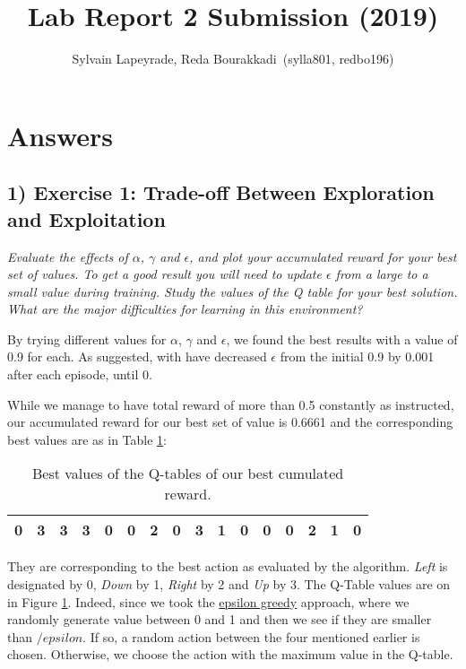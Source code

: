\documentclass[10pt]{article}
\title {Lab Report 2 Submission (2019)}
\author{Sylvain Lapeyrade, Reda Bourakkadi\, (sylla801, redbo196)}
\begin{document}
\maketitle

\section*{Answers}

\subsection*{1) \textbf{ Exercise 1: Trade-off Between Exploration and Exploitation}}

\textit{Evaluate the effects of $\alpha$, $\gamma$ and $\epsilon$, and plot your
 accumulated reward for your best set of values. To get a good result you will need 
 to update $\epsilon$ from a large to a small value during training. Study the values 
 of the Q table for your best solution. What are the major difficulties for learning
 in this environment?} \medskip
 
 By trying different values for $\alpha$, $\gamma$ and $\epsilon$, we found the best
 results with a value of 0.9 for each. As suggested, with have decreased $\epsilon$ from
 the initial 0.9 by 0.001 after each episode, until 0. \medskip
 
 While we manage to have total reward of more than 0.5 constantly as instructed,
  our accumulated reward for our best set of value is 0.6661 and the corresponding
  best values are as in Table \ref{table:1}:

\begin{table}[ht!]
  \begin{center}
    \begin{tabular}{|c|c|c|c|c|c|c|c|c|c|c|c|c|c|c|c|}
      \hline
          0 & 3 & 3 & 3 & 0 & 0 & 2 & 0 & 3 & 1 & 0 & 0 & 0 & 2 & 1 & 0 \\
      \hline
    \end{tabular}
    \caption{Best values of the Q-tables of our best cumulated reward.}
    \label{table:1}
  \end{center}
\end{table}

They are corresponding to the best action as evaluated by the algorithm. \textit{Left}
 is designated by 0, \textit{Down} by 1, \textit{Right} by 2 and \textit{Up} by 3. The
 Q-Table values are on in Figure \ref{table:1}. Indeed, since we took the \underline
 {epsilon greedy} approach, where we randomly generate value between 0 and 1 and then
 we see if they are smaller than $/epsilon$. If so, a random action between the four
 mentioned earlier is chosen. Otherwise, we choose the action with the maximum value
 in the Q-table.
 
\end{document}
